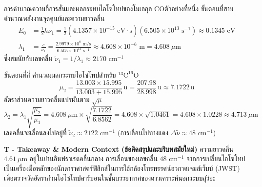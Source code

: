 \begin{psctbox}{การคำนวณความถี่การสั่นและผลกระทบไอโซโทปของโมเลกุล CO}{ตัวอย่างที่หนึ่ง}
ขั้นตอนที่สาม คำนวณพลังงานจุดศูนย์และความยาวคลื่น
\begin{align}
E_0 &= \frac{1}{2} h \nu_1 = \frac{1}{2}(4.1357 \times 10^{-15}\text{ eV}\cdot\text{s})(6.505 \times 10^{13}\text{ s}^{-1}) \approx 0.1345\text{ eV} \\
\lambda_1 &= \frac{c}{\nu_1} = \frac{2.9979 \times 10^8\text{ m/s}}{6.505 \times 10^{13}\text{ s}^{-1}} \approx 4.608 \times 10^{-6}\text{ m} = 4.608\ \mu\text{m}
\end{align}
ซึ่งสมนัยกับเลขคลื่น $\tilde{\nu}_1 = 1/\lambda_1 \approx 2170\text{ cm}^{-1}$

ขั้นตอนที่สี่ คำนวณผลกระทบไอโซโทปสำหรับ $^{13}\text{C}^{16}\text{O}$
\begin{equation}
\mu_2 = \frac{13.003 \times 15.995}{13.003 + 15.995} \, \text{u} = \frac{207.98}{28.998} \, \text{u} \approx 7.1722 \, \text{u}
\end{equation}
อัตราส่วนความยาวคลื่นแปรผันตาม $\sqrt{\mu}$
\begin{equation}
\lambda_2 = \lambda_1 \sqrt{\frac{\mu_2}{\mu_1}} = 4.608\ \mu\text{m} \times \sqrt{\frac{7.1722}{6.8562}} = 4.608 \times \sqrt{1.0461} = 4.608 \times 1.0228 \approx 4.713\ \mu\text{m}
\end{equation}
เลขคลื่นจะเลื่อนลงไปอยู่ที่ $\tilde{\nu}_2 \approx 2122\text{ cm}^{-1}$ (การเลื่อนไปทางแดง $\Delta\tilde{\nu} \approx 48\text{ cm}^{-1}$)

\vspace{6pt}
\noindent\textbf{T - Takeaway \& Modern Context (ข้อคิดสรุปและบริบทสมัยใหม่)} ความยาวคลื่น $4.61\ \mu\text{m}$ อยู่ในย่านอินฟราเรดคลื่นกลาง การเลื่อนของเลขคลื่น $48\text{ cm}^{-1}$ จากการเปลี่ยนไอโซโทปเป็นเครื่องมือหลักของนักดาราศาสตร์ฟิสิกส์ในการใช้กล้องโทรทรรศน์อวกาศเจมส์เว็บบ์ (JWST) เพื่อตรวจวัดอัตราส่วนไอโซโทปคาร์บอนในชั้นบรรยากาศของดาวเคราะห์นอกระบบสุริยะ
\end{psctbox}

